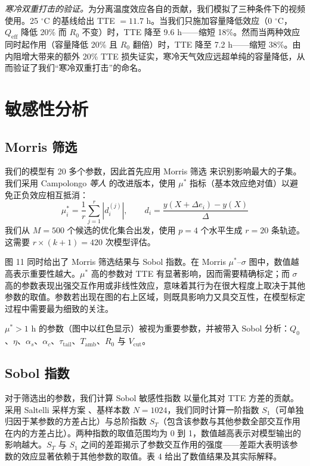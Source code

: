 \documentclass[11pt,a4paper]{ctexart}
\begin{document}
\textit{寒冷双重打击的验证。}为分离温度效应各自的贡献，我们模拟了三种条件下的视频使用。25 $^{\circ}$C 的基线给出 TTE $= 11.7$ h。当我们只施加容量降低效应（0 $^{\circ}$C，$Q_{\mathrm{eff}}$ 降低 20\% 而 $R_0$ 不变）时，TTE 降至 9.6 h——缩短 18\%。然而当两种效应同时起作用（容量降低 20\% 且 $R_0$ 翻倍）时，TTE 降至 7.2 h——缩短 38\%。由内阻增大带来的额外 20\% TTE 损失证实，寒冷天气效应远超单纯的容量降低，从而验证了我们“寒冷双重打击”的命名。

\section{敏感性分析}

\subsection{Morris 筛选}

我们的模型有 20 多个参数，因此首先应用 Morris 筛选 \cite{ref8} 来识别影响最大的子集。我们采用 Campolongo \textit{等人} \cite{ref9} 的改进版本，使用 $\mu^{*}$ 指标（基本效应绝对值）以避免正负效应相互抵消：
\begin{equation}
\mu_i^{*} = \frac{1}{r}\sum_{j=1}^{r}\left|d_i^{(j)}\right|,\qquad d_i = \frac{y(X+\Delta e_i)-y(X)}{\Delta}
\end{equation}
我们从 $M = 500$ 个候选的优化集合出发，使用 $p = 4$ 个水平生成 $r = 20$ 条轨迹。这需要 $r\times(k+1) = 420$ 次模型评估。

图 11 同时给出了 Morris 筛选结果与 Sobol 指数。在 Morris $\mu^{*}$--$\sigma$ 图中，数值越高表示重要性越大。$\mu^{*}$ 高的参数对 TTE 有显著影响，因而需要精确标定；而 $\sigma$ 高的参数表现出强交互作用或非线性效应，意味着其行为在很大程度上取决于其他参数的取值。参数若出现在图的右上区域，则既具影响力又具交互性，在模型标定过程中需要最为细致的关注。

$\mu^{*} > 1$ h 的参数（图中以红色显示）被视为重要参数，并被带入 Sobol 分析：$Q_0$、$\eta$、$\alpha_s$、$\alpha_c$、$\tau_{\mathrm{tail}}$、$T_{\mathrm{amb}}$、$R_0$ 与 $V_{\mathrm{cut}}$。

\subsection{Sobol 指数}

对于筛选出的参数，我们计算 Sobol 敏感性指数 \cite{ref10} 以量化其对 TTE 方差的贡献。采用 Saltelli 采样方案 \cite{ref11}、基样本数 $N = 1024$，我们同时计算一阶指数 $S_1$（可单独归因于某参数的方差占比）与总阶指数 $S_T$（包含该参数与其他参数全部交互作用在内的方差占比）。两种指数的取值范围均为 0 到 1，数值越高表示对模型输出的影响越大。$S_T$ 与 $S_1$ 之间的差距揭示了参数交互作用的强度——差距大表明该参数的效应显著依赖于其他参数的取值。表 4 给出了数值结果及其实际解释。
\end{document}
